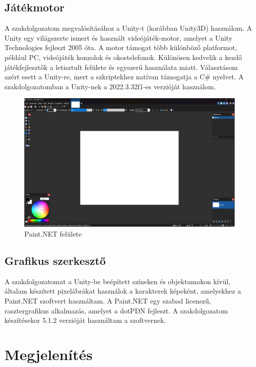 \documentclass[
]{thesis-ekf}
\theoremstyle{definition}
\theoremstyle{remark}
\begin{document}
\subsection{Játékmotor}

A szakdolgozatom megvalósításához a Unity-t (korábban Unity3D) használom. A Unity egy világszerte ismert és használt videójáték-motor, amelyet a Unity Technologies fejleszt 2005 óta. A motor támogat több különböző platformot, például PC, videójáték konzolok és okostelefonok. Különösen kedvelik a kezdő játékfejlesztők a letisztult felülete és egyszerű használata miatt. Választásom azért esett a Unity-re, mert a szkriptekhez natívan támogatja a C\# nyelvet. A szakdolgozatomban a Unity-nek a 2022.3.32f1-es verzióját használom.

\begin{figure}[h!]
	\centering
	\includegraphics[width=15cm]{./pictures/paint_net.png}
	\caption{Paint.NET felülete}
	\label{PaintNET}
\end{figure}

\subsection{Grafikus szerkesztő}

A szakdolgozatomat a Unity-be beépített színeken és objektumokon kívül, általam készített pixelábrákat használok a karakterek képeként, amelyekhez a Paint.NET szoftvert használtam. A Paint.NET egy szabad licenszű, rasztergrafikus alkalmazás, amelyet a dotPDN fejleszt. A szakdolgozatom készítésekor 5.1.2 verzióját használtam a szoftvernek.

\section{Megjelenítés}
\end{document}
